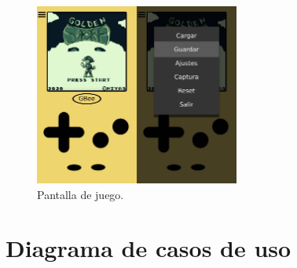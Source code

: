 \begin{figure}[H]
    \centering
    \includegraphics[width=0.6\textwidth]{include/images/mockgame.jpg}
    \caption{Pantalla de juego.}
    \label{figure:mockupgame}
\end{figure}

\section{Diagrama de casos de uso}

\cleardoublepage